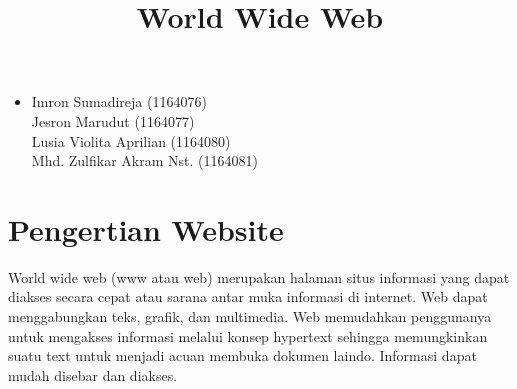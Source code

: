 \documentclass[12pt, a4paper]{article}
\begin{document}
\title{World Wide Web}
\maketitle

\begin{itemize}
\item
	Imron Sumadireja (1164076) \\
	Jesron Marudut (1164077) \\
	Lusia Violita Aprilian (1164080) \\
	Mhd. Zulfikar Akram Nst. (1164081) \\
\end{itemize}

\section{Pengertian Website}
World wide web (www atau web) merupakan halaman situs informasi yang dapat diakses secara cepat atau sarana antar muka informasi di internet. Web dapat menggabungkan teks, grafik, dan multimedia. Web memudahkan penggunanya untuk mengakses informasi melalui konsep hypertext sehingga memungkinkan  suatu text untuk menjadi acuan membuka dokumen laindo. Informasi dapat mudah disebar dan diakses.
\end{document}
